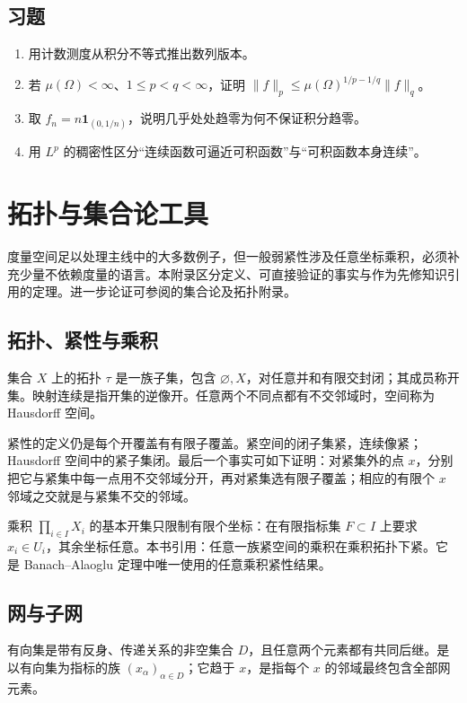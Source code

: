 \documentclass[UTF8,12pt,a4paper,fontset=fandol]{ctexbook}
\begin{document}
\section{习题}
\begin{enumerate}
 \item 用计数测度从积分不等式推出数列版本。
 \item 若 $\mu(\Omega)<\infty$、$1\leq p<q<\infty$，证明 $\|f\|_p\leq\mu(\Omega)^{1/p-1/q}\|f\|_q$。
 \item 取 $f_n=n\mathbf1_{(0,1/n)}$，说明几乎处处趋零为何不保证积分趋零。
 \item 用 $L^p$ 的稠密性区分“连续函数可逼近可积函数”与“可积函数本身连续”。
\end{enumerate}

\chapter{拓扑与集合论工具}
\label{app:fa-topology}

度量空间足以处理主线中的大多数例子，但一般弱紧性涉及任意坐标乘积，必须补充少量不依赖度量的语言。本附录区分定义、可直接验证的事实与作为先修知识引用的定理。进一步论证可参阅\cite{teschl-fa}的集合论及拓扑附录。

\section{拓扑、紧性与乘积}
集合 $X$ 上的拓扑 $\tau$ 是一族子集，包含 $\varnothing,X$，对任意并和有限交封闭；其成员称开集。映射连续是指开集的逆像开。任意两个不同点都有不交邻域时，空间称为 Hausdorff 空间。

紧性的定义仍是每个开覆盖有有限子覆盖。紧空间的闭子集紧，连续像紧；Hausdorff 空间中的紧子集闭。最后一个事实可如下证明：对紧集外的点 $x$，分别把它与紧集中每一点用不交邻域分开，再对紧集选有限子覆盖；相应的有限个 $x$ 邻域之交就是与紧集不交的邻域。

乘积 $\prod_{i\in I}X_i$ 的基本开集只限制有限个坐标：在有限指标集 $F\subset I$ 上要求 $x_i\in U_i$，其余坐标任意。本书引用：任意一族紧空间的乘积在乘积拓扑下紧。它是 Banach--Alaoglu 定理中唯一使用的任意乘积紧性结果。

\section{网与子网}
有向集是带有反身、传递关系的非空集合 $D$，且任意两个元素都有共同后继。是以有向集为指标的族 $(x_\alpha)_{\alpha\in D}$；它趋于 $x$，是指每个 $x$ 的邻域最终包含全部网元素。
\end{document}
